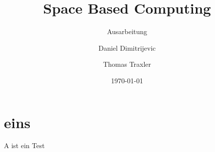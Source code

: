 \documentclass[a4paper,12pt]{scrreprt}
\begin{document}
\author{Daniel Dimitrijevic \and Thomas Traxler} %
\title{ Space Based Computing } %
\subject{VSDB} %
\subtitle{ Ausarbeitung } %
\date{\today} %
\publishers{5AHITT} %

\maketitle
\tableofcontents


\chapter{eins}
A ist ein \cite{Fowler2002} Test



%

\end{document}
